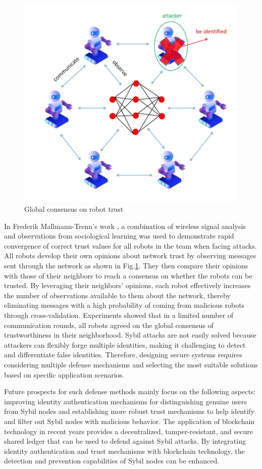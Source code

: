 \documentclass[conference]{IEEEtran}
\begin{document}
\begin{figure}[htbp]
    \centerline{\includegraphics[width=0.8\linewidth,height=0.6\linewidth]{picture/robot.jpg}}
    \caption{Global consensus on robot trust}
    \label{fig15}
\end{figure}

In Frederik Mallmann-Trenn's work \cite{b128}, a combination of wireless signal analysis and observations
from sociological learning was used to demonstrate rapid convergence of correct trust values
for all robots in the team when facing attacks. All robots develop their own opinions about
network trust by observing messages sent through the network as shown in Fig.\ref{fig15}. They then compare their
opinions with those of their neighbors to reach a consensus on whether the robots
can be trusted. By leveraging their neighbors' opinions, each robot effectively increases
the number of observations available to them about the network, thereby eliminating
messages with a high probability of coming from malicious robots through
cross-validation. Experiments showed that in a limited number of
communication rounds, all robots agreed on the global consensus of trustworthiness in their neighborhood.
Sybil attacks are not easily solved because attackers
can flexibly forge multiple identities, making it challenging
to detect and differentiate false identities.
Therefore, designing secure systems requires considering
multiple defense mechanisms and selecting the most suitable
solutions based on specific application scenarios.


Future prospects for such defense methods mainly focus on the following aspects:
improving identity authentication mechanisms for distinguishing genuine users from Sybil nodes
and establishing more robust trust mechanisms to help identify and filter out Sybil nodes with
malicious behavior. The application of blockchain technology in recent years provides a decentralized,
tamper-resistant, and secure shared ledger that can be used to defend against Sybil attacks.
By integrating identity authentication and trust mechanisms with blockchain technology,
the detection and prevention capabilities of Sybil nodes can be enhanced.
\end{document}
